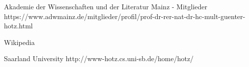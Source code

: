 Akademie der Wissenschaften und der Literatur Mainz - Mitglieder
https://www.adwmainz.de/mitglieder/profil/prof-dr-rer-nat-dr-hc-mult-guenter-hotz.html

Wikipedia

Saarland University
http://www-hotz.cs.uni-sb.de/home/hotz/